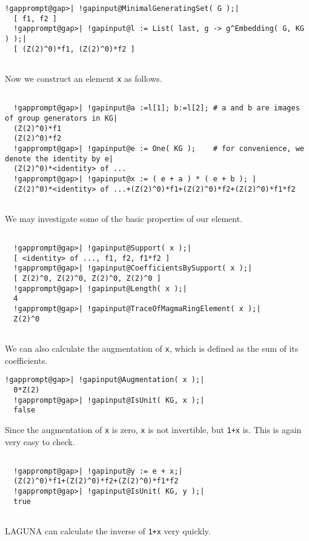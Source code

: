 \documentclass[a4paper,11pt]{report}
\begin{document}
{\begin{Verbatim}[commandchars=!@|,fontsize=\small,frame=single,label=Example]
  !gapprompt@gap>| !gapinput@MinimalGeneratingSet( G );|
  [ f1, f2 ]
  !gapprompt@gap>| !gapinput@l := List( last, g -> g^Embedding( G, KG ) );|
  [ (Z(2)^0)*f1, (Z(2)^0)*f2 ]
  
\end{Verbatim}
 Now we construct an element \texttt{x} as follows. 
\begin{Verbatim}[commandchars=!@|,fontsize=\small,frame=single,label=Example]
  
  !gapprompt@gap>| !gapinput@a :=l[1]; b:=l[2]; # a and b are images of group generators in KG|
  (Z(2)^0)*f1
  (Z(2)^0)*f2
  !gapprompt@gap>| !gapinput@e := One( KG );    # for convenience, we denote the identity by e|
  (Z(2)^0)*<identity> of ...
  !gapprompt@gap>| !gapinput@x := ( e + a ) * ( e + b ); |
  (Z(2)^0)*<identity> of ...+(Z(2)^0)*f1+(Z(2)^0)*f2+(Z(2)^0)*f1*f2  
  
\end{Verbatim}
 We may investigate some of the basic properties of our element. 
\begin{Verbatim}[commandchars=!@|,fontsize=\small,frame=single,label=Example]
  
  !gapprompt@gap>| !gapinput@Support( x );|
  [ <identity> of ..., f1, f2, f1*f2 ]
  !gapprompt@gap>| !gapinput@CoefficientsBySupport( x );|
  [ Z(2)^0, Z(2)^0, Z(2)^0, Z(2)^0 ]
  !gapprompt@gap>| !gapinput@Length( x );|
  4
  !gapprompt@gap>| !gapinput@TraceOfMagmaRingElement( x );|
  Z(2)^0
  
\end{Verbatim}
 We can also calculate the augmentation of \texttt{x}, which is defined as the sum of its coefficients. 
\begin{Verbatim}[commandchars=!@|,fontsize=\small,frame=single,label=Example]
  !gapprompt@gap>| !gapinput@Augmentation( x );|
  0*Z(2)
  !gapprompt@gap>| !gapinput@IsUnit( KG, x );|
  false
\end{Verbatim}
 Since the augmentation of \texttt{x} is zero, \texttt{x} is not invertible, but \texttt{1+x} is. This is again very easy to check. 
\begin{Verbatim}[commandchars=!@|,fontsize=\small,frame=single,label=Example]
  
  !gapprompt@gap>| !gapinput@y := e + x;|
  (Z(2)^0)*f1+(Z(2)^0)*f2+(Z(2)^0)*f1*f2
  !gapprompt@gap>| !gapinput@IsUnit( KG, y );|
  true  
  
\end{Verbatim}
 \textsf{LAGUNA} can calculate the inverse of \texttt{1+x} very quickly. 
\begin{Verbatim}[commandchars=!@|,fontsize=\small,frame=single,label=Example]
  

\end{Verbatim}}
\end{document}
